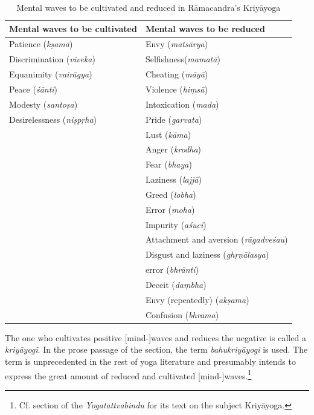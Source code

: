 \begin{table}[H]
    \centering
    \begin{tabularx}{\textwidth}{XX}
        \toprule
        \textbf{Mental waves to be cultivated} & \textbf{Mental waves to be reduced} \\
        \midrule
        Patience (\textit{kṣamā}) & Envy (\textit{matsārya}) \\
        Discrimination (\textit{viveka}) & Selfishness(\textit{mamatā})\\
        Equanimity (\textit{vairāgya}) & Cheating (\textit{māyā})\\
        Peace (\textit{śānti}) & Violence (\textit{hiṃsā})\\
        Modesty (\textit{santoṣa}) & Intoxication (\textit{mada})\\
        Desirelessness (\textit{niṣpṛha}) & Pride (\textit{garvata})\\
        & Lust (\textit{kāma}) \\
        & Anger (\textit{krodha}) \\
        & Fear (\textit{bhaya})\\
        & Laziness (\textit{lajjā})\\
        & Greed (\textit{lobha})\\
        & Error (\textit{moha})\\
        & Impurity (\textit{aśuci})\\
        & Attachment and aversion (\textit{rāgadveśau}) \\
        & Disgust and laziness (\textit{ghṛṇālasya})\\
        & error (\textit{bhrānti})\\
        & Deceit (\textit{daṃbha})\\
        & Envy (repeatedly) (\textit{akṣama})\\
        & Confusion (\textit{bhrama})\\
        \bottomrule
    \end{tabularx}
    \caption{Mental waves to be cultivated and reduced in Rāmacandra's Kriyāyoga}
    \label{tab:waves}
\end{table}

The one who cultivates positive [mind-]waves and reduces the negative is called a \textit{kriyāyogī}. In the prose passage of the section, the term \textit{bahukriyāyogi} is used. The term is unprecedented in the rest of yoga literature and presumably intends to express the great amount of reduced and cultivated [mind-]waves.\footnote{Cf. section  of the \textit{Yogatattvabindu} for its text on the subject Kriyāyoga.} 

